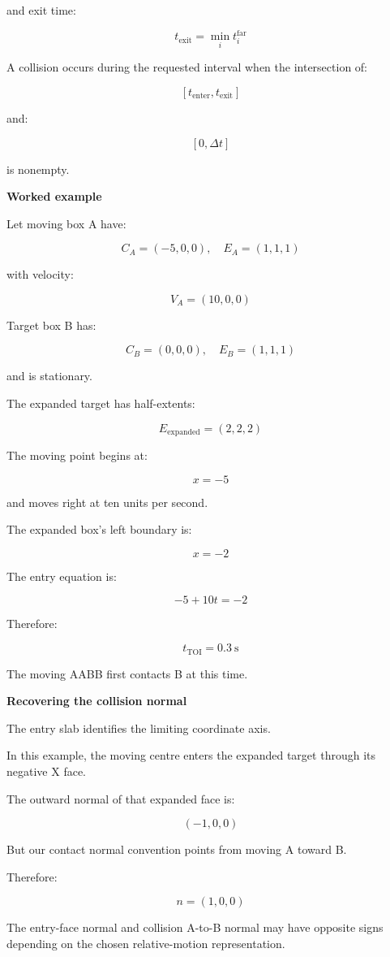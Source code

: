 and exit time:

\[
\boxed{ t_{\mathrm{exit}}=\min_i t_i^{\mathrm{far}} }
\]

A collision occurs during the requested interval when the intersection of:

\[
[t_{\mathrm{enter}},t_{\mathrm{exit}}]
\]

and:

\[
[0,\Delta t]
\]

is nonempty.

\textbf{Worked example}

Let moving box A have:

\[
C_A=(-5,0,0),\quad E_A=(1,1,1)
\]

with velocity:

\[
V_A=(10,0,0)
\]

Target box B has:

\[
C_B=(0,0,0),\quad E_B=(1,1,1)
\]

and is stationary.

The expanded target has half-extents:

\[
E_{\mathrm{expanded}}=(2,2,2)
\]

The moving point begins at:

\[
x=-5
\]

and moves right at ten units per second.

The expanded box's left boundary is:

\[
x=-2
\]

The entry equation is:

\[
-5+10t=-2
\]

Therefore:

\[
\boxed{ t_{\mathrm{TOI}}=0.3\ \mathrm{s} }
\]

The moving AABB first contacts B at this time.

\textbf{Recovering the collision normal}

The entry slab identifies the limiting coordinate axis.

In this example, the moving centre enters the expanded target through its negative X face.

The outward normal of that expanded face is:

\[
(-1,0,0)
\]

But our contact normal convention points from moving A toward B.

Therefore:

\[
\boxed{ n=(1,0,0) }
\]

The entry-face normal and collision A-to-B normal may have opposite signs depending on the chosen relative-motion representation.

